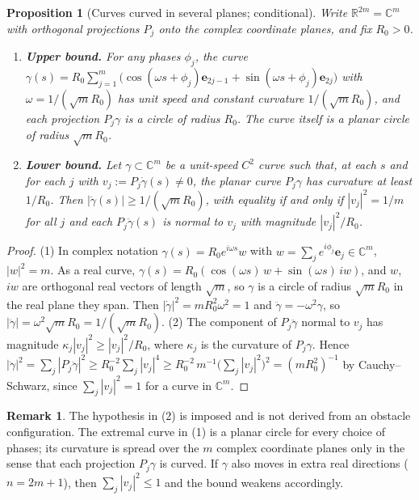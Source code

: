 \documentclass[11pt,reqno]{amsart}
\newtheorem{proposition}[theorem]{Proposition}
\theoremstyle{definition}
\newtheorem{remark}[theorem]{Remark}
\providecommand{\R}{\mathbb{R}}
\newcommand{\C}{\mathbb{C}}
\numberwithin{equation}{section}
\providecommand{\R}{\mathbb{R}}
\begin{document}
\begin{proposition}[Curves curved in several planes; conditional]
\label{thm:scaling_law}
Write $\R^{2m} = \C^m$ with orthogonal projections $P_j$ onto the complex coordinate planes, and fix $R_0 > 0$.
\begin{enumerate}
    \item \textbf{Upper bound.} For any phases $\phi_j$, the curve $\gamma(s) = R_0 \sum_{j=1}^m \big( \cos(\omega s + \phi_j) \mathbf{e}_{2j-1} + \sin(\omega s + \phi_j) \mathbf{e}_{2j} \big)$ with $\omega = 1/(\sqrt m R_0)$ has unit speed and constant curvature $1/(\sqrt m R_0)$, and each projection $P_j\gamma$ is a circle of radius $R_0$. The curve itself is a planar circle of radius $\sqrt m R_0$.
    \item \textbf{Lower bound.} Let $\gamma \subset \C^m$ be a unit-speed $C^2$ curve such that, at each $s$ and for each $j$ with $v_j := P_j\dot\gamma(s) \ne 0$, the planar curve $P_j\gamma$ has curvature at least $1/R_0$. Then $|\ddot\gamma(s)| \ge 1/(\sqrt m R_0)$, with equality if and only if $|v_j|^2 = 1/m$ for all $j$ and each $P_j\ddot\gamma(s)$ is normal to $v_j$ with magnitude $|v_j|^2/R_0$.
\end{enumerate}
\end{proposition}

\begin{proof}
(1) In complex notation $\gamma(s) = R_0 e^{i\omega s} w$ with $w = \sum_j e^{i\phi_j}\mathbf{e}_j \in \C^m$, $|w|^2 = m$. As a real curve, $\gamma(s) = R_0(\cos(\omega s)\, w + \sin(\omega s)\, iw)$, and $w$, $iw$ are orthogonal real vectors of length $\sqrt m$, so $\gamma$ is a circle of radius $\sqrt m R_0$ in the real plane they span. Then $|\dot\gamma|^2 = m R_0^2\omega^2 = 1$ and $\ddot\gamma = -\omega^2\gamma$, so $|\ddot\gamma| = \omega^2 \sqrt m R_0 = 1/(\sqrt m R_0)$.
(2) The component of $P_j\ddot\gamma$ normal to $v_j$ has magnitude $\kappa_j |v_j|^2 \ge |v_j|^2/R_0$, where $\kappa_j$ is the curvature of $P_j\gamma$. Hence $|\ddot\gamma|^2 = \sum_j |P_j\ddot\gamma|^2 \ge R_0^{-2}\sum_j |v_j|^4 \ge R_0^{-2}\, m^{-1}\big(\sum_j |v_j|^2\big)^2 = (m R_0^2)^{-1}$ by Cauchy--Schwarz, since $\sum_j |v_j|^2 = 1$ for a curve in $\C^m$.
\end{proof}

\begin{remark}
The hypothesis in (2) is imposed and is not derived from an obstacle configuration. The extremal curve in (1) is a planar circle for every choice of phases; its curvature is spread over the $m$ complex coordinate planes only in the sense that each projection $P_j\gamma$ is curved. If $\gamma$ also moves in extra real directions ($n = 2m+1$), then $\sum_j |v_j|^2 \le 1$ and the bound weakens accordingly.
\end{remark}
\end{document}
